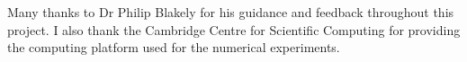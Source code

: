 
\begin{acknowledgements}      

Many thanks to Dr Philip Blakely for his guidance and feedback throughout this
project. I also thank the Cambridge Centre for Scientific Computing for
providing the computing platform used for the numerical experiments.


\end{acknowledgements}
